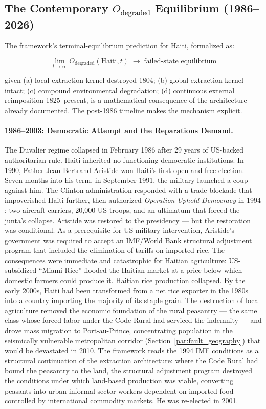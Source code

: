 \subsection{The Contemporary $O_{\text{degraded}}$ Equilibrium (1986--2026)}
\label{subsec:contemporary_haiti_equilibrium}

The framework's terminal-equilibrium prediction for Haiti, formalized as:

\begin{equation}\label{eq:12.9-degraded-equilibrium}
\lim_{t \to \infty} O_{\text{degraded}}(\text{Haiti}, t) \;\to\; \text{failed-state equilibrium}
\end{equation}

\noindent given (a) local extraction kernel destroyed 1804; (b) global extraction kernel intact; (c) compound environmental degradation; (d) continuous external reimposition 1825--present, is a mathematical consequence of the architecture already documented. The post-1986 timeline makes the mechanism explicit.

\paragraph{1986--2003: Democratic Attempt and the Reparations Demand.}
The Duvalier regime collapsed in February 1986 after 29 years of US-backed authoritarian rule. Haiti inherited no functioning democratic institutions. In 1990, Father Jean-Bertrand Aristide won Haiti's first open and free election. Seven months into his term, in September 1991, the military launched a coup against him. The Clinton administration responded with a trade blockade that impoverished Haiti further, then authorized \textit{Operation Uphold Democracy} in 1994 \cite{clinton_uphold_democracy_1994}: two aircraft carriers, 20,000 US troops, and an ultimatum that forced the junta's collapse. Aristide was restored to the presidency --- but the restoration was conditional. As a prerequisite for US military intervention, Aristide's government was required to accept an IMF/World Bank structural adjustment program that included the elimination of tariffs on imported rice. The consequences were immediate and catastrophic for Haitian agriculture: US-subsidized ``Miami Rice'' flooded the Haitian market at a price below which domestic farmers could produce it. Haitian rice production collapsed. By the early 2000s, Haiti had been transformed from a net rice exporter in the 1980s into a country importing the majority of its staple grain. The destruction of local agriculture removed the economic foundation of the rural peasantry --- the same class whose forced labor under the Code Rural had serviced the indemnity --- and drove mass migration to Port-au-Prince, concentrating population in the seismically vulnerable metropolitan corridor (Section~\ref{par:fault_geography}) that would be devastated in 2010. The framework reads the 1994 IMF conditions as a structural continuation of the extraction architecture: where the Code Rural had bound the peasantry to the land, the structural adjustment program destroyed the conditions under which land-based production was viable, converting peasants into urban informal-sector workers dependent on imported food controlled by international commodity markets. He was re-elected in 2001.

